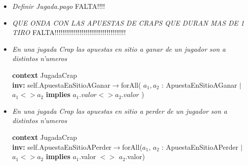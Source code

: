 \begin{itemize}
\clearpage



\item\textit{Definir Jugada.pago}
FALTA!!!!


\item\textit{QUE ONDA CON LAS APUESTAS DE CRAPS QUE DURAN MAS DE 1 TIRO}
FALTA!!!!!!!!!!!!!!!!!!!!!!!!!!!!!!!!!!!!!


\item\textit{ En una jugada Crap las apuestas en sitio a ganar de un jugador son a distintos n'umeros}

\textbf{context}  JugadaCrap \\ \textbf{inv:} 
  self.ApuestaEnSitioAGanar$\rightarrow$forAll( $a_{1}, a_{2}$ : ApuestaEnSitioAGanar $ | $ $ a_{1} <> a_{2} $  \textbf{implies} $ a_{1}.valor <> a_{2}.valor $ )


\item\textit{ En una jugada Crap las apuestas en sitio a perder de un jugador son a distintos n'umeros}

\textbf{context}  JugadaCrap \\ \textbf{inv:} 
  self.ApuestaEnSitioAPerder$\rightarrow$forAll($a_{1}$, $a_{2}$ : ApuestaEnSitioAPerder  $ | $ $a_{1} <> a_{2} $ \textbf{implies} $a_{1}$.valor $<>$ $a_{2}$.valor)

\end{itemize}
